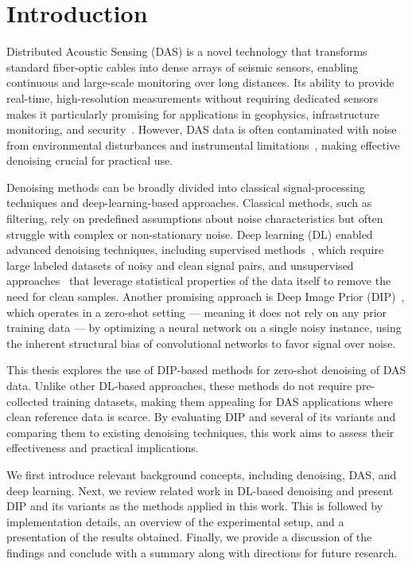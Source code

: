 \chapter{Introduction}

Distributed Acoustic Sensing (DAS) is a novel technology that transforms standard fiber-optic cables into dense arrays of seismic sensors, enabling continuous and large-scale monitoring over long distances.
Its ability to provide real-time, high-resolution measurements without requiring dedicated sensors makes it particularly promising for applications in geophysics, infrastructure monitoring, and security~\cite{SelfMixed,DAS-N2N}.
However, DAS data is often contaminated with noise from environmental disturbances and instrumental limitations~\cite{IDF}, making effective denoising crucial for practical use.

Denoising methods can be broadly divided into classical signal-processing techniques and deep-learning-based approaches. Classical methods, such as filtering, rely on predefined assumptions about noise characteristics but often struggle with complex or non-stationary noise.
Deep learning (DL) enabled advanced denoising techniques, including supervised methods~\cite{DnCNN,N2N}, which require large labeled datasets of noisy and clean signal pairs, and unsupervised approaches~\cite{Noisier2Noise,N2V,N2S} that leverage statistical properties of the data itself to remove the need for clean samples.
Another promising approach is Deep Image Prior (DIP)~\cite{DIP}, which operates in a zero-shot setting --- meaning it does not rely on any prior training data --- by optimizing a neural network on a single noisy instance, using the inherent structural bias of convolutional networks to favor signal over noise.

This thesis explores the use of DIP-based methods for zero-shot denoising of DAS data.
Unlike other DL-based approaches, these methods do not require pre-collected training datasets, making them appealing for DAS applications where clean reference data is scarce.
By evaluating DIP and several of its variants and comparing them to existing denoising techniques, this work aims to assess their effectiveness and practical implications.

We first introduce relevant background concepts, including denoising, DAS, and deep learning.
Next, we review related work in DL-based denoising and present DIP and its variants as the methods applied in this work. This is followed by implementation details, an overview of the experimental setup, and a presentation of the results obtained.
Finally, we provide a discussion of the findings and conclude with a summary along with directions for future research.
